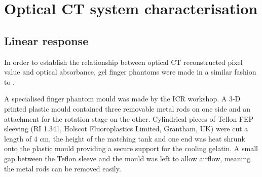 








\section{Optical CT system characterisation}

\subsection{Linear response}

In order to establish the relationship between optical CT reconstructed pixel value and optical absorbance,  gel finger phantoms were made in a similar fashion to \cite{Oldham:2003}.  


A specialised finger phantom mould was made by the ICR workshop. A 3-D printed plastic mould contained three removable metal rods on one side and an attachment for the rotation stage on the other. 
Cylindrical pieces of Teflon FEP sleeving (RI 1.341, Holscot Fluoroplastics Limited, Grantham, UK) were cut a length of 4 cm, the height of the matching tank and one end was heat shrunk onto the plastic mould providing a secure support for the cooling gelatin. A small gap between the Teflon sleeve and the mould was left to allow airflow, meaning the metal rods can be removed easily. 


